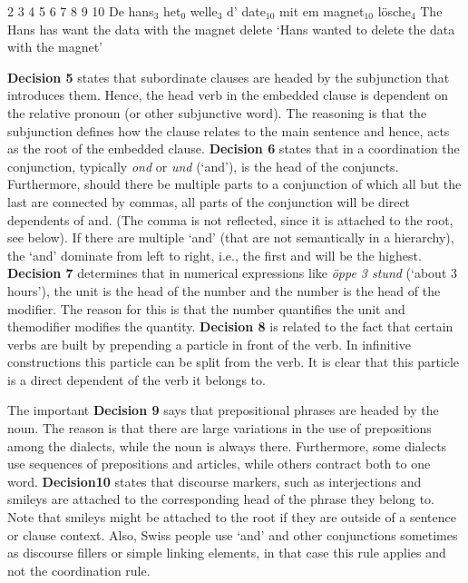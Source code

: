 \documentclass[11pt,letterpaper, covington]{article}
\begin{document}
 2 3 4 5 6 7 8 9 10
De hans$_3$ het$_0$ welle$_3$ d' date$_{10}$ mit em magnet$_{10}$ lösche$_4$
The Hans has want the data with the magnet delete
\glt `Hans wanted to delete the data with the magnet'
\glend

\textbf{Decision 5} states that subordinate clauses are headed by the subjunction that introduces them. Hence, the head verb in the embedded clause is dependent on the relative pronoun (or other subjunctive word). The reasoning is that the subjunction defines how the clause relates to the main sentence and hence, acts as the root of the embedded clause.
\textbf{Decision 6} states that in a coordination the conjunction, typically \emph{ond} or \emph{und} (`and'), is the head of the conjuncts. Furthermore, should there be multiple parts to a conjunction of which all but the last are connected by commas, all parts of the conjunction will be direct dependents of and. (The comma is not reflected, since it is attached to the root, see below). If there are multiple `and' (that are not semantically in a hierarchy), the `and' dominate from left to right, i.e., the first and will be the highest.
\textbf{Decision 7} determines that in numerical expressions like \emph{öppe 3 stund} (`about 3 hours'), the unit is the head of the number and the number is the head of the modifier. The reason for this is that the number quantifies the unit and themodifier modifies the quantity.
\textbf{Decision 8} is related to the fact that certain verbs are built by prepending a particle in front of the verb. In infinitive constructions this particle can be split from the verb. It is clear that this particle is a direct dependent of the verb it belongs to.

The important \textbf{Decision 9} says that prepositional phrases are headed by the noun. The reason is that there are large variations in the use of prepositions among the dialects, while the noun is always there. Furthermore, some dialects use sequences of prepositions and articles, while others contract both to one word. \textbf{Decision10} states that discourse markers, such as interjections and smileys are attached to the corresponding head of the phrase they belong to. Note that smileys might be attached to the root if they are outside of a sentence  or clause context. Also, Swiss people use `and' and other conjunctions sometimes as discourse fillers or simple linking elements, in that case this rule applies and not the coordination rule.
\end{document}
